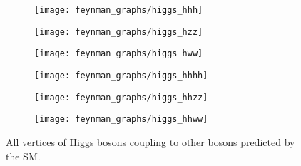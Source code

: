 \begin{figure}[htbp]
  \centering

  \begin{subfigure}{0.33\textwidth}
    \centering
    \texttt{[image: feynman\_graphs/higgs\_hhh]}
    \subcaption{}
    \label{fig:vertex_hhh}
  \end{subfigure}%
  \begin{subfigure}{0.33\textwidth}
    \centering
    \texttt{[image: feynman\_graphs/higgs\_hzz]}
    \subcaption{}
  \end{subfigure}%
  \begin{subfigure}{0.33\textwidth}
    \centering
    \texttt{[image: feynman\_graphs/higgs\_hww]}
    \subcaption{}
  \end{subfigure}

  \vspace{1em}

  \begin{subfigure}{0.33\textwidth}
    \centering
    \texttt{[image: feynman\_graphs/higgs\_hhhh]}
    \subcaption{}
    \label{fig:vertex_hhhh}
  \end{subfigure}%
  \begin{subfigure}{0.33\textwidth}
    \centering
    \texttt{[image: feynman\_graphs/higgs\_hhzz]}
    \subcaption{}
  \end{subfigure}%
  \begin{subfigure}{0.33\textwidth}
    \centering
    \texttt{[image: feynman\_graphs/higgs\_hhww]}
    \subcaption{}
  \end{subfigure}

  \caption{All vertices of Higgs bosons coupling to other bosons predicted by
    the SM.}%
  \label{fig:higgs_vertices}
\end{figure}


